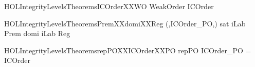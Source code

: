 \begin{SaveVerbatim}{HOLIntegrityLevelsTheoremsICOrderXXWO}
\HOLTokenTurnstile{} WeakOrder ICOrder
\end{SaveVerbatim}
\newcommand{\HOLIntegrityLevelsTheoremsICOrderXXWO}{\UseVerbatim{HOLIntegrityLevelsTheoremsICOrderXXWO}}
\begin{SaveVerbatim}{HOLIntegrityLevelsTheoremsPremXXdomiXXReg}
\HOLTokenTurnstile{} (,ICOrder_PO,) sat iLab Prem domi iLab Reg
\end{SaveVerbatim}
\newcommand{\HOLIntegrityLevelsTheoremsPremXXdomiXXReg}{\UseVerbatim{HOLIntegrityLevelsTheoremsPremXXdomiXXReg}}
\begin{SaveVerbatim}{HOLIntegrityLevelsTheoremsrepPOXXICOrderXXPO}
\HOLTokenTurnstile{} repPO ICOrder_PO = ICOrder
\end{SaveVerbatim}
\newcommand{\HOLIntegrityLevelsTheoremsrepPOXXICOrderXXPO}{\UseVerbatim{HOLIntegrityLevelsTheoremsrepPOXXICOrderXXPO}}
\newcommand{\HOLIntegrityLevelsTheorems}{
\HOLThmTag{IntegrityLevels}{IClass_PO_antisymmetric}\HOLIntegrityLevelsTheoremsIClassXXPOXXantisymmetric
\HOLThmTag{IntegrityLevels}{IClass_PO_reflexive}\HOLIntegrityLevelsTheoremsIClassXXPOXXreflexive
\HOLThmTag{IntegrityLevels}{IClass_PO_transitive}\HOLIntegrityLevelsTheoremsIClassXXPOXXtransitive
\HOLThmTag{IntegrityLevels}{ICOrder_antisymmetric}\HOLIntegrityLevelsTheoremsICOrderXXantisymmetric
\HOLThmTag{IntegrityLevels}{ICOrder_reflexive}\HOLIntegrityLevelsTheoremsICOrderXXreflexive
\HOLThmTag{IntegrityLevels}{ICOrder_simp}\HOLIntegrityLevelsTheoremsICOrderXXsimp
\HOLThmTag{IntegrityLevels}{ICOrder_transitive}\HOLIntegrityLevelsTheoremsICOrderXXtransitive
\HOLThmTag{IntegrityLevels}{ICOrder_WO}\HOLIntegrityLevelsTheoremsICOrderXXWO
\HOLThmTag{IntegrityLevels}{Prem_domi_Reg}\HOLIntegrityLevelsTheoremsPremXXdomiXXReg
\HOLThmTag{IntegrityLevels}{repPO_ICOrder_PO}\HOLIntegrityLevelsTheoremsrepPOXXICOrderXXPO
}
